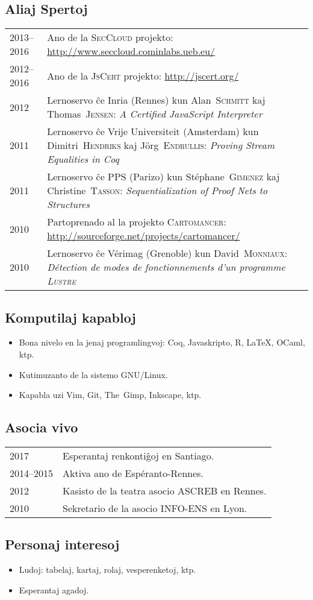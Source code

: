 \documentclass[12pt,a4paper]{article}
\makeatletter
\newcommand{\en}[1]{\foreignlanguage{english}{{#1}}}
\newcommand{\fr}[1]{\foreignlanguage{french}{{#1}}}
\newcommand{\en}[1]{\foreignlanguage{english}{{#1}}}
\newcommand{\fr}[1]{\foreignlanguage{french}{{#1}}}
\newenvironment{datecvsection}[1]%
               {\subsection*{#1}%
                 \noindent \begin{tabular}{@{}p{\annee}p{\texte}@{}}}
               {\end{tabular}}
\newenvironment{itemcvsection}[1]%
               {\subsection*{#1}\begin{itemize}}
               {\end{itemize}}
\newcommand\familyName{\textsc}
\newcommand\placeName{}
\makeatother
\begin{document}
\begin{datecvsection}{Aliaj Spertoj}

	2013–2016 & Ano de la \textsc{SecCloud} projekto:  \url{http://www.seccloud.cominlabs.ueb.eu/} \\

	2012–2016 & Ano de la \textsc{JsCert} projekto:  \url{http://jscert.org/} \\

    2012 & Lernoservo ĉe \placeName{Inria} (\placeName{Rennes}) kun Alan~\familyName{Schmitt} kaj Thomas~\familyName{Jensen}:
	\en{\textit{A Certified JavaScript Interpreter}} \\

    2011 & Lernoservo ĉe \placeName{Vrĳe Universiteit} (\placeName{Amsterdam}) kun Dimitri~\familyName{Hendriks} kaj Jörg~\familyName{Endrullis}:
	\en{\textit{Proving Stream Equalities in Coq}} \\

    2011 & Lernoservo ĉe \placeName{PPS} (\placeName{Parizo}) kun Stéphane~\familyName{Gimenez} kaj Christine~\familyName{Tasson}:
	\en{\textit{Sequentialization of Proof Nets to Structures}} \\

	2010 & Partoprenado al la projekto \textsc{Cartomancer}:  \url{http://sourceforge.net/projects/cartomancer/} \\

    2010 & Lernoservo ĉe \placeName{Vérimag} (\placeName{Grenoble}) kun David~\familyName{Monniaux}:
    \fr{\textit{Détection de modes de fonctionnements d’un programme \textsc{Lustre}}} \\

\end{datecvsection}

\begin{itemcvsection}{Komputilaj kapabloj}

  \item Bona nivelo en la jenaj programlingvoj:  Coq, Javaskripto, R, \LaTeX, OCaml, ktp.
  \item Kutimuzanto de la sistemo GNU/Linux.
  \item Kapabla uzi Vim, Git, The~Gimp, Inkscape, ktp.

\end{itemcvsection}

\begin{datecvsection}{Asocia vivo}

    2017 & Esperantaj renkontiĝoj en \placeName{Santiago}. \\
    2014–2015 & Aktiva ano de {Espéranto-Rennes}. \\
	2012 & Kasisto de la teatra asocio {ASCREB} en \placeName{Rennes}. \\
	2010 & Sekretario de la asocio \textsc{INFO-ENS} en \placeName{Lyon}.

\end{datecvsection}

\begin{itemcvsection}{Personaj interesoj}

  \item Ludoj: tabelaj, kartaj, rolaj, vesperenketoj, ktp.
  \item Esperantaj agadoj.

\end{itemcvsection}
\end{document}
